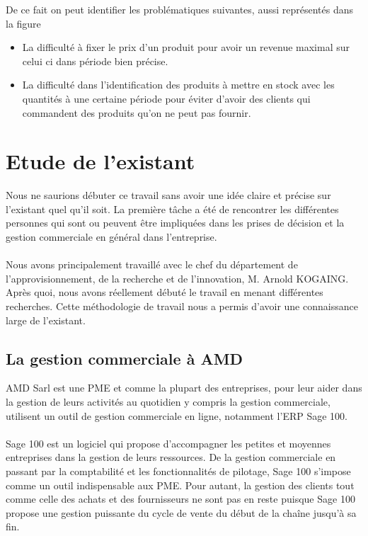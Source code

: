 De ce fait on peut identifier les problématiques suivantes, aussi représentés dans la figure 
\begin{itemize}
    \item La difficulté à fixer le prix d'un produit pour avoir un revenue maximal sur celui ci dans période bien précise.
    \item La difficulté dans l'identification des produits à mettre en stock avec les quantités à une certaine période pour éviter d'avoir des clients qui commandent des produits qu'on ne peut pas fournir.
\end{itemize}



\section{Etude de l’existant}
Nous ne saurions débuter ce travail sans avoir une idée claire et précise sur l’existant quel qu’il soit. La première tâche a été de rencontrer les différentes personnes qui sont ou peuvent être impliquées dans les prises de décision et la gestion commerciale en général dans l’entreprise. 
\paragraph{}
Nous avons principalement travaillé avec le chef du département de l’approvisionnement, de la recherche et de l’innovation, M. Arnold KOGAING. Après quoi, nous avons réellement débuté le travail en menant différentes recherches. Cette méthodologie de travail nous a permis d’avoir une connaissance large de l’existant.

\subsection{La gestion commerciale à AMD}
AMD Sarl est une PME et comme la plupart des entreprises, pour leur aider dans la gestion de leurs activités au quotidien y compris la gestion commerciale, utilisent un outil de gestion commerciale en ligne, notamment l’ERP Sage 100.
\paragraph{}
Sage 100 est un logiciel qui propose d’accompagner les petites et moyennes entreprises dans la gestion de leurs ressources. De la gestion commerciale en passant par la comptabilité et les fonctionnalités de pilotage, Sage 100 s’impose comme un outil indispensable aux PME. Pour autant, la gestion des clients tout comme celle des achats et des fournisseurs ne sont pas en reste puisque Sage 100 propose une gestion puissante du cycle de vente du début de la chaîne jusqu’à sa fin.
